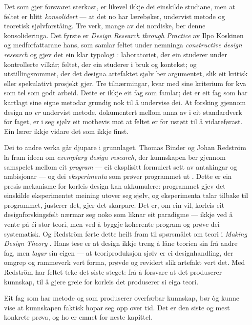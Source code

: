 Det som gjer forsvaret sterkast, er likevel ikkje dei einskilde studiane, men at feltet er blitt \emph{konsolidert} — at det no har lærebøker, undervist metode og teoretisk sjølvforståing. Tre verk, mange av dei nordiske, ber denne konsolideringa. Det fyrste er \textit{Design Research through Practice} av Ilpo Koskinen og medforfattarane hans, som samlar feltet under nemninga \emph{constructive design research} og gjev det ein klar typologi \autocite{koskinen2011constructive}: laboratoriet, der ein studerer under kontrollerte vilkår; feltet, der ein studerer i bruk og kontekst; og utstillingsrommet, der det designa artefaktet sjølv ber argumentet, slik eit kritisk eller spekulativt prosjekt gjer. Tre tilnærmingar, kvar med sine kriterium for kva som tel som godt arbeid. Dette er ikkje eit fag som famlar; det er eit fag som har kartlagt sine eigne metodar grundig nok til å undervise dei. At forsking gjennom design no \emph{er} undervist metode, dokumentert mellom anna av \textcite{stappers2017rtd} i eit standardverk for faget, er i seg sjølv eit motbevis mot at feltet er for ustøtt til å vidareførast. Ein lærer ikkje vidare det som ikkje finst.

Dei to andre verka går djupare i grunnlaget. Thomas Binder og Johan Redström la fram ideen om \emph{exemplary design research}, der kunnskapen ber gjennom samspelet mellom eit \emph{program} — eit eksplisitt formulert sett av antakingar og ambisjonar — og dei \emph{eksperimenta} som prøver programmet ut \autocite{binder2006exemplary}. Dette er ein presis mekanisme for korleis design kan akkumulere: programmet gjev det einskilde eksperimentet meining utover seg sjølv, og eksperimenta talar tilbake til programmet, justerer det, gjer det skarpare. Det er, om ein vil, korleis eit designforskingsfelt nærmar seg noko som liknar eit paradigme — ikkje ved å vente på éi stor teori, men ved å byggje koherente program og prøve dei systematisk. Og Redström førte dette heilt fram til spørsmålet om teori i \textit{Making Design Theory} \autocite{redstrom2017making}. Hans tese er at design ikkje treng å låne teorien sin frå andre fag, men \emph{lagar} sin eigen — at teoriproduksjon sjølv er ei designhandling, der omgrep og rammeverk vert forma, prøvde og revidert slik artefakt vert det. Med Redström har feltet teke det siste steget: frå å forsvare at det produserer kunnskap, til å gjere greie for korleis det produserer si eiga teori.

\vignett

Eit fag som har metode og som produserer overførbar kunnskap, bør òg kunne vise at kunnskapen faktisk hopar seg opp over tid. Det er den siste og mest konkrete prøva, og ho er emnet for neste kapittel.

